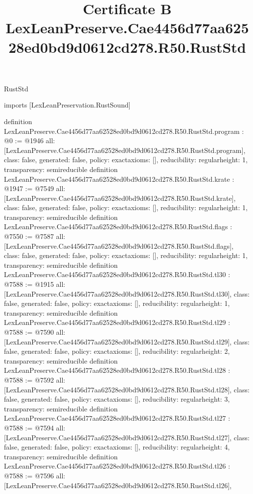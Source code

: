 \begin{lexlean}{RustStd}
\title{Certificate B LexLeanPreserve.Cae4456d77aa62528ed0bd9d0612cd278.R50.RustStd}
\begin{coremodule}
imports [LexLeanPreservation.RustSound]

definition LexLeanPreserve.Cae4456d77aa62528ed0bd9d0612cd278.R50.RustStd.program : @0 := @1946 {
  all: [LexLeanPreserve.Cae4456d77aa62528ed0bd9d0612cd278.R50.RustStd.program],
  class: false,
  generated: false,
  policy: exact{axioms: []},
  reducibility: regular{height: 1},
  transparency: semireducible
}
definition LexLeanPreserve.Cae4456d77aa62528ed0bd9d0612cd278.R50.RustStd.krate : @1947 := @7549 {
  all: [LexLeanPreserve.Cae4456d77aa62528ed0bd9d0612cd278.R50.RustStd.krate],
  class: false,
  generated: false,
  policy: exact{axioms: []},
  reducibility: regular{height: 1},
  transparency: semireducible
}
definition LexLeanPreserve.Cae4456d77aa62528ed0bd9d0612cd278.R50.RustStd.flags : @7550 := @7587 {
  all: [LexLeanPreserve.Cae4456d77aa62528ed0bd9d0612cd278.R50.RustStd.flags],
  class: false,
  generated: false,
  policy: exact{axioms: []},
  reducibility: regular{height: 1},
  transparency: semireducible
}
definition LexLeanPreserve.Cae4456d77aa62528ed0bd9d0612cd278.R50.RustStd.tl30 : @7588 := @1915 {
  all: [LexLeanPreserve.Cae4456d77aa62528ed0bd9d0612cd278.R50.RustStd.tl30],
  class: false,
  generated: false,
  policy: exact{axioms: []},
  reducibility: regular{height: 1},
  transparency: semireducible
}
definition LexLeanPreserve.Cae4456d77aa62528ed0bd9d0612cd278.R50.RustStd.tl29 : @7588 := @7590 {
  all: [LexLeanPreserve.Cae4456d77aa62528ed0bd9d0612cd278.R50.RustStd.tl29],
  class: false,
  generated: false,
  policy: exact{axioms: []},
  reducibility: regular{height: 2},
  transparency: semireducible
}
definition LexLeanPreserve.Cae4456d77aa62528ed0bd9d0612cd278.R50.RustStd.tl28 : @7588 := @7592 {
  all: [LexLeanPreserve.Cae4456d77aa62528ed0bd9d0612cd278.R50.RustStd.tl28],
  class: false,
  generated: false,
  policy: exact{axioms: []},
  reducibility: regular{height: 3},
  transparency: semireducible
}
definition LexLeanPreserve.Cae4456d77aa62528ed0bd9d0612cd278.R50.RustStd.tl27 : @7588 := @7594 {
  all: [LexLeanPreserve.Cae4456d77aa62528ed0bd9d0612cd278.R50.RustStd.tl27],
  class: false,
  generated: false,
  policy: exact{axioms: []},
  reducibility: regular{height: 4},
  transparency: semireducible
}
definition LexLeanPreserve.Cae4456d77aa62528ed0bd9d0612cd278.R50.RustStd.tl26 : @7588 := @7596 {
  all: [LexLeanPreserve.Cae4456d77aa62528ed0bd9d0612cd278.R50.RustStd.tl26],
}
\end{coremodule}
\end{lexlean}

